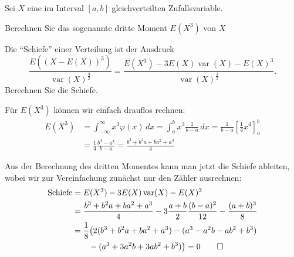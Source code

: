 Sei $X$ eine im Interval $[a,b]$ gleichverteilten Zufallsvariable.
\begin{teilaufgaben}
\item Berechnen Sie das sogenannte dritte Moment $E(X^3)$ von $X$
\item Die ``Schiefe'' einer Verteilung ist der Ausdruck
\[
\frac{E((X-E(X))^3)}{\operatorname{var}(X)^{\frac32}}
=
\frac{E(X^3)-3E(X)\operatorname{var}(X)-E(X)^3}{\operatorname{var}(X)^{\frac32}}.
\]
Berechnen Sie die Schiefe.
\end{teilaufgaben}


\begin{loesung}
\begin{teilaufgaben}
\item
Für $E(X^3)$ können wir einfach drauflos rechnen:
\begin{align*}
E(X^3)
&=
\int_{-\infty}^\infty x^3\varphi(x)\,dx
=
\int_a^bx^3\frac1{b-a}\,dx
=
\frac1{b-a}\left[\frac14x^4\right]_a^b
\\
&=
\frac14\frac{b^4-a^4}{b-a}
=
\frac{b^3+b^2a+ba^2+a^3}{4}
\end{align*}
\item Aus der Berechnung des dritten Momentes kann man jetzt
die Schiefe ableiten, wobei wir zur Vereinfachung zunächst
nur den Zähler ausrechnen:
\begin{align*}
\text{Schiefe}
&=
E(X^3)-3E(X)\operatorname{var}(X)-E(X)^3
\\
&=
\frac{b^3+b^2a+ba^2+a^3}{4}
-3\frac{a+b}2\frac{(b-a)^2}{12}
-\frac{(a+b)^3}{8}
\\
&=
\frac18\bigl(
2(b^3+b^2a+ba^2+a^3)
-(a^3-a^2b-ab^2+b^3)
\\
&\qquad
-(a^3+3a^2b+3ab^2+b^3)
\bigr)
=0
\qedhere
\end{align*}
\end{teilaufgaben}
\end{loesung}

